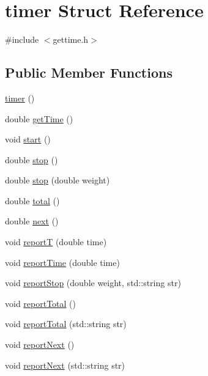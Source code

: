 \hypertarget{structtimer}{}\section{timer Struct Reference}
\label{structtimer}


{\ttfamily \#include $<$gettime.\+h$>$}

\subsection*{Public Member Functions}
\begin{DoxyCompactItemize}
\item 
\mbox{\hyperlink{structtimer_ae536faf93e02933cd025a6fbcbb48d0a}{timer}} ()
\item 
double \mbox{\hyperlink{structtimer_a597befd9cd3b4d37419f91e5380e00ae}{get\+Time}} ()
\item 
void \mbox{\hyperlink{structtimer_a9aa894a57748b2bdf3adce46f5736794}{start}} ()
\item 
double \mbox{\hyperlink{structtimer_a6008e62616dc97a34f52df092cd43cb1}{stop}} ()
\item 
double \mbox{\hyperlink{structtimer_ab13f3fefbcf9427b0bb9e2081ea3aea1}{stop}} (double weight)
\item 
double \mbox{\hyperlink{structtimer_a1d51e750078352abcabedc232e122dbc}{total}} ()
\item 
double \mbox{\hyperlink{structtimer_a3528919bd98e23283cc0046fc5406ff6}{next}} ()
\item 
void \mbox{\hyperlink{structtimer_a18f1ffc85c804ee50a0e835c07abe5b2}{reportT}} (double time)
\item 
void \mbox{\hyperlink{structtimer_adcf87a7455e8e9ca9abb133427bebb39}{report\+Time}} (double time)
\item 
void \mbox{\hyperlink{structtimer_a19e58704fe4de6c537dbe5aa2a3ce3c2}{report\+Stop}} (double weight, std\+::string str)
\item 
void \mbox{\hyperlink{structtimer_a94d8ef06e519bc2daad6a2871769dcc6}{report\+Total}} ()
\item 
void \mbox{\hyperlink{structtimer_a2ca02959907cfd5a411d88460531cec3}{report\+Total}} (std\+::string str)
\item 
void \mbox{\hyperlink{structtimer_a8d9f92edc40c64921b36cc8d1ef5f5a5}{report\+Next}} ()
\item 
void \mbox{\hyperlink{structtimer_a7b1a86c7ecf45b606632f959ac4cd51e}{report\+Next}} (std\+::string str)
\end{DoxyCompactItemize}
